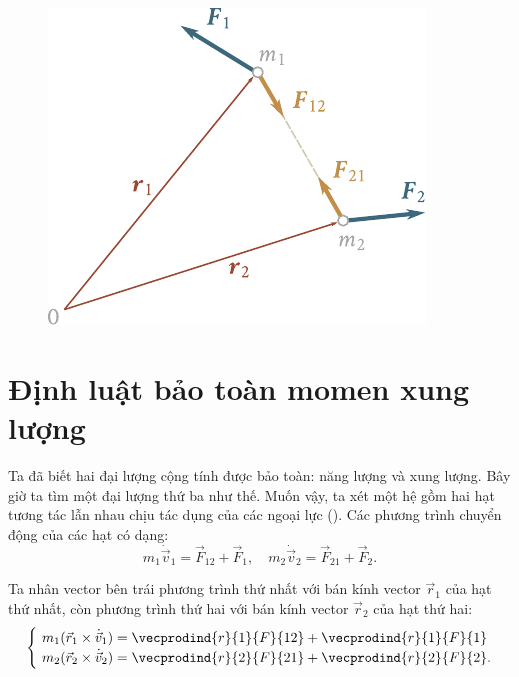 \begin{figure}[!htb]
	\begin{center}
		\includegraphics[scale=1]{figures/ch_03/fig_3_17.pdf}
		\caption[]{}
		\label{fig:3_17}
	\end{center}
\end{figure}

\section{Định luật bảo toàn momen xung lượng}\label{sec:3_12}
   
Ta đã biết hai đại lượng cộng tính được bảo toàn: năng lượng và xung lượng. Bây giờ ta tìm một đại lượng thứ ba như thế. Muốn vậy, ta xét một hệ gồm hai hạt tương tác lẫn nhau chịu tác dụng của các ngoại lực (). Các phương trình chuyển động của các hạt có dạng:
\begin{equation*}
m_1\dot{\vec{v}}_1 = \vec{F}_{12} + \vec{F}_1,\quad m_2\dot{\vec{v}}_2 = \vec{F}_{21} + \vec{F}_2.
\end{equation*}

\noindent
Ta nhân vector bên trái phương trình thứ nhất với bán kính vector $\vec{r}_1$ của hạt thứ nhất, còn phương trình thứ hai với bán kính vector $\vec{r}_2$ của hạt thứ hai:
\begin{equation}\label{eq:3_101}
\begin{cases}
& \!\!\!\! m_1(\vec{r}_1\times\dot{\vec{v}}_1) = \vecprodind{r}{1}{F}{12} + \vecprodind{r}{1}{F}{1}\\
& \!\!\!\! m_2(\vec{r}_2\times\dot{\vec{v}}_2) = \vecprodind{r}{2}{F}{21} + \vecprodind{r}{2}{F}{2}.
\end{cases}
\end{equation}

